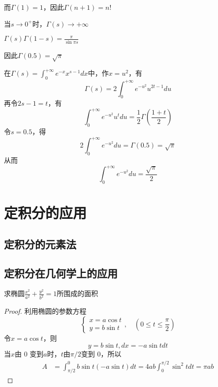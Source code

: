 \documentclass[11pt]{article}
\begin{document}
而\(\Gamma(1)=1\)，因此\(\Gamma(n+1)=n!\)

\begin{proposition}[]
当\(s\to0^+\)时，\(\Gamma(s)\to+\infty\)
\end{proposition}

\begin{proposition}[余元公式]
\(\Gamma(s)\Gamma(1-s)=\frac{\pi}{\sin\pi s}\)
\end{proposition}

因此\(\Gamma(0.5)=\sqrt{\pi}\)

在\(\Gamma(s)=\int_0^{+\infty}e^{-x}x^{s-1}dx\)中，作\(x=u^2\)，有
\begin{equation*}
\Gamma(s)=2\int_0^{+\infty}e^{-u^2}u^{2t-1}du
\end{equation*}
再令\(2s-1=t\)，有
\begin{equation*}
 \int_0^{+\infty}e^{-u^2}u^tdu=\frac{1}{2}\Gamma(\frac{1+t}{2})
\end{equation*}
令\(s=0.5\)，得
\begin{equation*}
2\int_0^{+\infty}e^{-u^2}du=\Gamma(0.5)=\sqrt{\pi}
\end{equation*}
从而
\begin{equation*}
\int_0^{+\infty}e^{-u^2}du=\frac{\sqrt{\pi}}{2}
\end{equation*}





\section{定积分的应用}
\label{sec:org5bfeb62}
\subsection{定积分的元素法}
\label{sec:orgb706565}
\subsection{定积分在几何学上的应用}
\label{sec:org3ded523}
\begin{examplle}[]
求椭圆\(\frac{x^2}{a^2}+\frac{y^2}{b^2}=1\)所围成的面积
\end{examplle}

\begin{proof}
利用椭圆的参数方程
\begin{equation*}
\begin{cases}
x=a\cos t \\
y=b\sin t
\end{cases},\quad (0\le t\le\frac{\pi}{2})
\end{equation*}
令\(x=a\cos t\)，则
\begin{equation*}
y=b\sin t,dx=-a\sin t dt
\end{equation*}
当\(x\)由 0 变到\(a\)时，\(t\)由\(\pi/2\)变到 0，所以
\begin{align*}
A&=\int_{\pi/2}^0b\sin t(-a\sin t)dt=4ab\int_0^{\pi/2}\sin^2tdt=\pi ab
\end{align*}
\end{proof}
\end{document}
